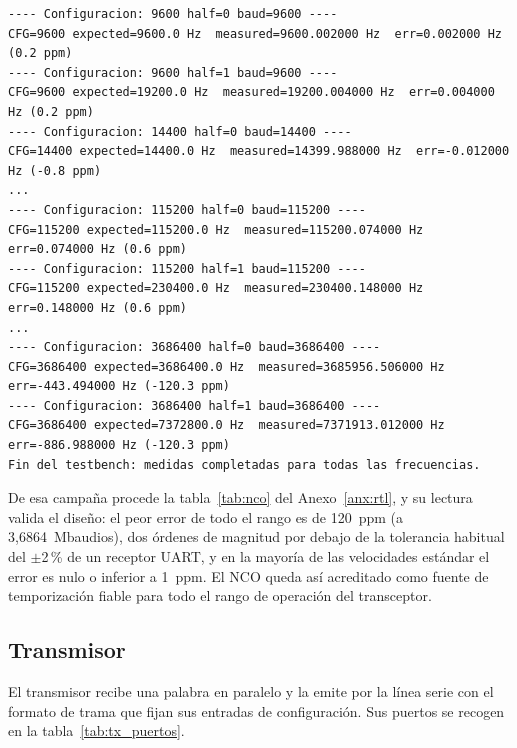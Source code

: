 \begin{lstlisting}[style=terminal, caption={Salida de la simulación de \texttt{tb\_NCO.vhd} (extracto)}]
---- Configuracion: 9600 half=0 baud=9600 ----
CFG=9600 expected=9600.0 Hz  measured=9600.002000 Hz  err=0.002000 Hz (0.2 ppm)
---- Configuracion: 9600 half=1 baud=9600 ----
CFG=9600 expected=19200.0 Hz  measured=19200.004000 Hz  err=0.004000 Hz (0.2 ppm)
---- Configuracion: 14400 half=0 baud=14400 ----
CFG=14400 expected=14400.0 Hz  measured=14399.988000 Hz  err=-0.012000 Hz (-0.8 ppm)
...
---- Configuracion: 115200 half=0 baud=115200 ----
CFG=115200 expected=115200.0 Hz  measured=115200.074000 Hz  err=0.074000 Hz (0.6 ppm)
---- Configuracion: 115200 half=1 baud=115200 ----
CFG=115200 expected=230400.0 Hz  measured=230400.148000 Hz  err=0.148000 Hz (0.6 ppm)
...
---- Configuracion: 3686400 half=0 baud=3686400 ----
CFG=3686400 expected=3686400.0 Hz  measured=3685956.506000 Hz  err=-443.494000 Hz (-120.3 ppm)
---- Configuracion: 3686400 half=1 baud=3686400 ----
CFG=3686400 expected=7372800.0 Hz  measured=7371913.012000 Hz  err=-886.988000 Hz (-120.3 ppm)
Fin del testbench: medidas completadas para todas las frecuencias.
\end{lstlisting}

De esa campaña procede la tabla~\ref{tab:nco} del Anexo~\ref{anx:rtl}, y su lectura valida el diseño: el peor
error de todo el rango es de 120~ppm (a 3,6864~Mbaudios), dos órdenes de magnitud por debajo de la
tolerancia habitual del $\pm$2\,\% de un receptor UART, y en la mayoría de las velocidades estándar
el error es nulo o inferior a 1~ppm. El NCO queda así acreditado como fuente de temporización
fiable para todo el rango de operación del transceptor.

\subsection{Transmisor}

El transmisor recibe una palabra en paralelo y la emite por la línea serie con el formato de
trama que fijan sus entradas de configuración. Sus puertos se recogen en la
tabla~\ref{tab:tx_puertos}.

